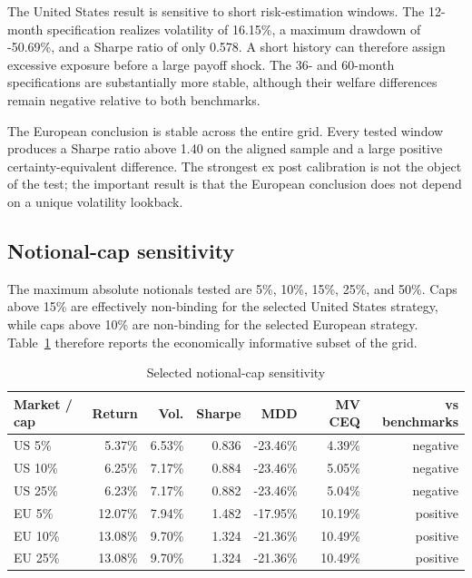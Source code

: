 The United States result is sensitive to short risk-estimation windows. The 12-month specification realizes volatility of 16.15\%, a maximum drawdown of -50.69\%, and a Sharpe ratio of only 0.578. A short history can therefore assign excessive exposure before a large payoff shock. The 36- and 60-month specifications are substantially more stable, although their welfare differences remain negative relative to both benchmarks.

The European conclusion is stable across the entire grid. Every tested window produces a Sharpe ratio above 1.40 on the aligned sample and a large positive certainty-equivalent difference. The strongest ex post calibration is not the object of the test; the important result is that the European conclusion does not depend on a unique volatility lookback.

\subsection{Notional-cap sensitivity}

The maximum absolute notionals tested are 5\%, 10\%, 15\%, 25\%, and 50\%. Caps above 15\% are effectively non-binding for the selected United States strategy, while caps above 10\% are non-binding for the selected European strategy. Table~\ref{tab:cap_robustness} therefore reports the economically informative subset of the grid.

\begin{table}[htbp]
\centering
\small
\caption{Selected notional-cap sensitivity}
\label{tab:cap_robustness}
\begin{tabularx}{\textwidth}{Xrrrrrr}
\toprule
Market / cap
& Return
& Vol.
& Sharpe
& MDD
& MV CEQ
& vs benchmarks \\
\midrule
US 5\%
& 5.37\%
& 6.53\%
& 0.836
& -23.46\%
& 4.39\%
& negative \\
US 10\%
& 6.25\%
& 7.17\%
& 0.884
& -23.46\%
& 5.05\%
& negative \\
US 25\%
& 6.23\%
& 7.17\%
& 0.882
& -23.46\%
& 5.04\%
& negative \\
EU 5\%
& 12.07\%
& 7.94\%
& 1.482
& -17.95\%
& 10.19\%
& positive \\
EU 10\%
& 13.08\%
& 9.70\%
& 1.324
& -21.36\%
& 10.49\%
& positive \\
EU 25\%
& 13.08\%
& 9.70\%
& 1.324
& -21.36\%
& 10.49\%
& positive \\
\bottomrule
\end{tabularx}
\end{table}

